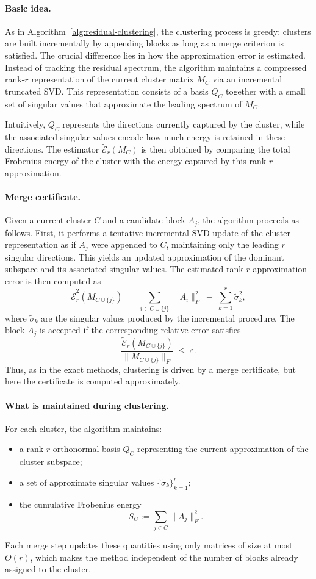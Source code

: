 \documentclass[10pt]{article} %
\begin{document}
\paragraph{Basic idea.}
As in Algorithm~\ref{alg:residual-clustering}, the clustering process is
greedy: clusters are built incrementally by appending blocks as long as a
merge criterion is satisfied. The crucial difference lies in how the
approximation error is estimated. Instead of tracking the residual spectrum,
the algorithm maintains a compressed rank-$r$ representation of the current
cluster matrix $M_C$ via an incremental truncated SVD. This representation
consists of a basis $Q_C$ together with a small set of singular values that
approximate the leading spectrum of $M_C$.

Intuitively, $Q_C$ represents the directions currently captured by the
cluster, while the associated singular values encode how much energy is
retained in these directions. The estimator
$\widetilde{\mathcal{E}}_r(M_C)$ is then obtained by comparing the total
Frobenius energy of the cluster with the energy captured by this rank-$r$
approximation.

\paragraph{Merge certificate.}
Given a current cluster $C$ and a candidate block $A_j$, the algorithm
proceeds as follows. First, it performs a tentative incremental SVD update of
the cluster representation as if $A_j$ were appended to $C$, maintaining only
the leading $r$ singular directions. This yields an updated approximation of
the dominant subspace and its associated singular values. The estimated
rank-$r$ approximation error is then computed as
\[
  \widetilde{\mathcal{E}}_r^2(M_{C\cup\{j\}})
  \;=\;
  \sum_{i\in C\cup\{j\}} \|A_i\|_F^2
  \;-\;
  \sum_{k=1}^r \widetilde{\sigma}_k^2,
\]
where $\widetilde{\sigma}_k$ are the singular values produced by the
incremental procedure. The block $A_j$ is accepted if the corresponding
relative error satisfies
\[
  \frac{\widetilde{\mathcal{E}}_r(M_{C\cup\{j\}})}
       {\|M_{C\cup\{j\}}\|_F}
  \;\le\; \varepsilon.
\]
Thus, as in the exact methods, clustering is driven by a merge certificate,
but here the certificate is computed approximately.

\paragraph{What is maintained during clustering.}
For each cluster, the algorithm maintains:
\begin{itemize}
  \item a rank-$r$ orthonormal basis $Q_C$ representing the current
  approximation of the cluster subspace;
  \item a set of approximate singular values
  $\{\widetilde{\sigma}_k\}_{k=1}^r$;
  \item the cumulative Frobenius energy
  \[
    S_C := \sum_{j\in C}\|A_j\|_F^2.
  \]
\end{itemize}
Each merge step updates these quantities using only matrices of size at most
$O(r)$, which makes the method independent of the number of blocks already
assigned to the cluster.
\end{document}
